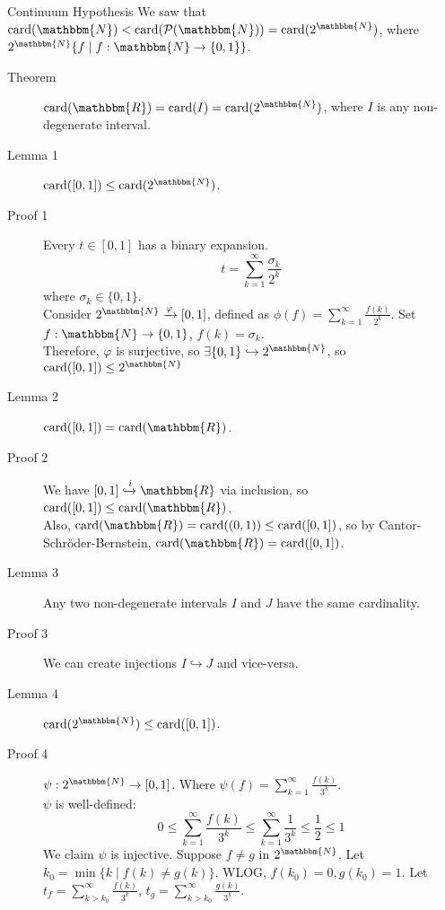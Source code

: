 \documentclass[10pt]{extarticle}
\newcommand{\card}{\text{card}}
\newcommand{\N}{\mathbbm{N}}
\newcommand{\R}{\mathbbm{R}}
\begin{document}
  \begin{problem}{Continuum Hypothesis}
    We saw that $\card(\N) < \card(\mathcal{P}(\N)) = \card(2^{\N})$, where $2^\N\{f\mid f:\N\rightarrow\{0,1\}\}$.
    \begin{description}
      \item[Theorem] $\card(\R) = \card(I)=\card(2^{\N})$, where $I$ is any non-degenerate interval.
    \end{description}
    \tcblower
    \begin{description}
      \item[Lemma 1] $\card([0,1]) \leq \card(2^{\N})$.
      \item[Proof 1] Every $t\in [0,1]$ has a binary expansion.
        \[
          t = \sum_{k = 1}^{\infty} \frac{\sigma_k}{2^k}
        \] 
        where $\sigma_k \in \{0,1\}$. \\

        Consider $2^{\N} \xrightarrow{\varphi} [0,1]$, defined as $\displaystyle \phi(f) = \sum_{k=1}^{\infty}\frac{f(k)}{2^k}$. Set $f: \N \rightarrow \{0,1\}$, $f(k) = \sigma_k$.\\

          Therefore, $\varphi$ is surjective, so $\exists \{0,1\}\hookrightarrow 2^{\N}$, so $\card([0,1]) \leq 2^{\N}$
        \item[Lemma 2] $\card([0,1]) = \card(\R)$.
        \item[Proof 2] We have $[0,1]\xhookrightarrow{i} \R$ via inclusion, so $\card([0,1])\leq \card(\R)$.\\

          Also, $\card(\R) = \card((0,1)) \leq \card([0,1])$, so by Cantor-Schröder-Bernstein, $\card(\R) = \card([0,1])$.
        \item[Lemma 3] Any two non-degenerate intervals $I$ and $J$ have the same cardinality. 
        \item[Proof 3] We can create injections $I\hookrightarrow J$ and vice-versa.
        \item[Lemma 4] $\card(2^{\N}) \leq \card([0,1])$.
        \item[Proof 4] $\psi: 2^{\N} \rightarrow [0,1]$. Where $\psi(f) = \sum_{k = 1}^{\infty}\frac{f(k)}{3^k}$.\\

          $\psi$ is well-defined:
          \[
            0\leq \sum_{k=1}^{\infty}\frac{f(k)}{3^k} \leq \sum_{k=1}^{\infty}\frac{1}{3^k} \leq \frac{1}{2} \leq 1
          \] 
          We claim $\psi$ is injective. Suppose $f\neq g$ in $2^{\N}$. Let $k_0 = \min\{k\mid f(k) \neq g(k)\}$. WLOG, $f(k_0) = 0, g(k_0) = 1$. Let $t_f = \sum_{k>k_0}^{\infty}\frac{f(k)}{3^k}$, $t_g = \sum_{k>k_0}^{\infty}\frac{g(k)}{3^k}$.\\


\end{description}
\end{problem}
\end{document}
